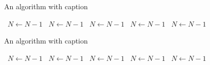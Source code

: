 \documentclass[a4paper]{article}
\begin{document}
\begin{algorithm}
\caption{An algorithm with caption}
\begin{algorithmic}
\    \State $N \gets N - 1$
\    \State $N \gets N - 1$
\    \State $N \gets N - 1$
\    \State $N \gets N - 1$
\    \State $N \gets N - 1$
\EndWhile
\end{algorithmic}
\end{algorithm}

\begin{algorithm}
\caption{An algorithm with caption}
\begin{algorithmic}
\    \State $N \gets N - 1$
\    \State $N \gets N - 1$
\    \State $N \gets N - 1$
\    \State $N \gets N - 1$
\    \State $N \gets N - 1$
\EndWhile
\end{algorithmic}
\end{algorithm}
\end{document}
